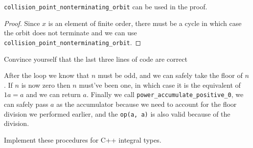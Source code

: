 \begin{lemma}
	\verb|collision_point_nonterminating_orbit| can be used in the proof.
\end{lemma}

\begin{proof}
	Since $x$ is an element of finite order, there must be a cycle in which case the orbit
	does not terminate and we can use \verb|collision_point_nonterminating_orbit|.
\end{proof}

\begin{exercise}
	Convince yourself that the last three lines of code are correct
\end{exercise}

\begin{solution}
	After the loop we know that $n$ must be odd, and we can safely take the
	floor of $n$. If $n$ is now zero then $n$ must've been one, in which case it is the
	equivalent of $1a = a$ and we can return $a$. Finally we call \verb|power_accumulate_positive_0|,
	we can safely pass $a$ as the accumulator because we need to account for the floor division
	we performed earlier, and the \verb|op(a, a)| is also valid because of the division.
\end{solution}

\begin{exercise}
	Implement these procedures for C++ integral types.
\end{exercise}
